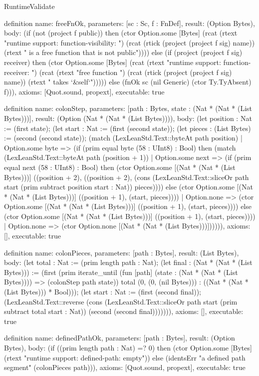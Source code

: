 \begin{lexlean}{RuntimeValidate}
\begin{semanticmodule}
definition{
  name: freeFnOk,
  parameters: [sc : Sc, f : FnDef],
  result: (Option Bytes),
  body: (if (not (project f public)) then (ctor Option.some [Bytes] (rcat (rtext "runtime support: function-visibility: ") (rcat (rtick (project (project f sig) name)) (rtext " is a free function that is not public")))) else (if (project (project f sig) receiver) then (ctor Option.some [Bytes] (rcat (rtext "runtime support: function-receiver: ") (rcat (rtext "free function ") (rcat (rtick (project (project f sig) name)) (rtext " takes `&self`"))))) else (fnOk sc (nil Generic) (ctor Ty.TyAbsent) f))),
  axioms: [Quot.sound, propext],
  executable: true
}

definition{
  name: colonStep,
  parameters: [path : Bytes, state : (Nat * (Nat * (List Bytes)))],
  result: (Option (Nat * (Nat * (List Bytes)))),
  body: (let position : Nat := (first state); (let start : Nat := (first (second state)); (let pieces : (List Bytes) := (second (second state)); (match (LexLeanStd.Text::byteAt path position)
    | Option.some byte => (if (prim equal byte (58 : UInt8) : Bool) then (match (LexLeanStd.Text::byteAt path (position + 1))
      | Option.some next => (if (prim equal next (58 : UInt8) : Bool) then (ctor Option.some [(Nat * (Nat * (List Bytes)))] ((position + 2), ((position + 2), (cons (LexLeanStd.Text::sliceOr path start (prim subtract position start : Nat)) pieces)))) else (ctor Option.some [(Nat * (Nat * (List Bytes)))] ((position + 1), (start, pieces))))
      | Option.none => (ctor Option.some [(Nat * (Nat * (List Bytes)))] ((position + 1), (start, pieces)))) else (ctor Option.some [(Nat * (Nat * (List Bytes)))] ((position + 1), (start, pieces))))
    | Option.none => (ctor Option.none [(Nat * (Nat * (List Bytes)))]))))),
  axioms: [],
  executable: true
}

definition{
  name: colonPieces,
  parameters: [path : Bytes],
  result: (List Bytes),
  body: (let total : Nat := (prim length path : Nat); (let final : (Nat * (Nat * (List Bytes))) := (first (prim iterate_until (fun [path] (state : (Nat * (Nat * (List Bytes)))) => (colonStep path state)) total (0, (0, (nil Bytes))) : ((Nat * (Nat * (List Bytes))) * Bool))); (let start : Nat := (first (second final)); (LexLeanStd.Text::reverse (cons (LexLeanStd.Text::sliceOr path start (prim subtract total start : Nat)) (second (second final))))))),
  axioms: [],
  executable: true
}

definition{
  name: definedPathOk,
  parameters: [path : Bytes],
  result: (Option Bytes),
  body: (if ((prim length path : Nat) =? 0) then (ctor Option.some [Bytes] (rtext "runtime support: defined-path: empty")) else (identsErr "a defined path segment" (colonPieces path))),
  axioms: [Quot.sound, propext],
  executable: true
}


\end{semanticmodule}
\end{lexlean}
